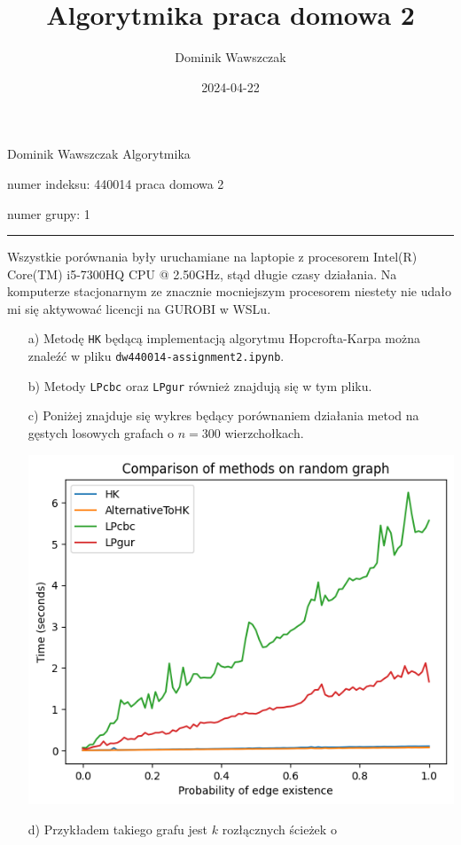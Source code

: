 \documentclass[12pt]{article}
\title{Algorytmika praca domowa 2}
\author{Dominik Wawszczak}
\date{2024-04-22}
\begin{document}
    \setlength{\parindent}{0 cm}
    
    Dominik Wawszczak \hfill Algorytmika
    
    numer indeksu: 440014 \hfill praca domowa 2
    
    numer grupy: 1
    
    \bigskip
    \hrule
    \bigskip
    
    Wszystkie porównania były uruchamiane na laptopie z procesorem Intel(R)
    Core(TM) i5-7300HQ CPU @ 2.50GHz, stąd długie czasy działania. Na
    komputerze stacjonarnym ze znacznie mocniejszym procesorem niestety nie
    udało mi się aktywować licencji na GUROBI w WSLu.
    
    \begin{itemize}
        \item[a)] Metodę \texttt{HK} będącą implementacją algorytmu
                  Hopcrofta-Karpa można znaleźć w pliku
                  \texttt{dw440014-assignment2.ipynb}.
        \item[b)] Metody \texttt{LPcbc} oraz \texttt{LPgur} również znajdują
                  się w tym pliku.
        \item[c)] Poniżej znajduje się wykres będący porównaniem działania
                  metod na gęstych losowych grafach o \(n = 300\)
                  wierzchołkach.
                  \begin{center}
                      \includegraphics[scale = 0.8]{image_01.png}
                  \end{center}
        \item[d)] Przykładem takiego grafu jest \(k\) rozłącznych ścieżek o

\end{itemize}
\end{document}
